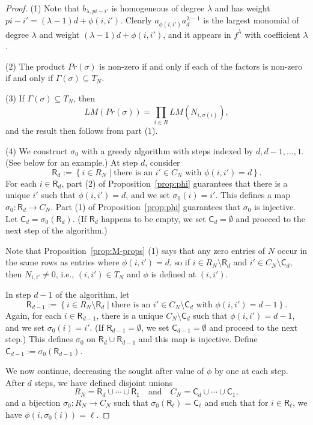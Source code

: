 \documentclass[12pt,reqno]{amsart}
\numberwithin{equation}{section}
\theoremstyle{plain}
\theoremstyle{definition}
\theoremstyle{remark}
\numberwithin{equation}{section}
\newcommand{\<}{\langle}
\renewcommand{\>}{\rangle}
\renewcommand{\and}{\quad\text{and}\quad}
\newcommand{\Rs}{\mathsf{R}}
\newcommand{\Cs}{\mathsf{C}}
\begin{document}
\begin{proof}\mbox{}
  (1) Note that $b_{\lambda,pi-i'}$ is homogeneous of degree $\lambda$
  and has weight $pi-i'=(\lambda-1)d+\phi(i,i')$.  Clearly
  $a_{\phi(i,i')}a_d^{\lambda-1}$ is the largest monomial of degree
  $\lambda$ and weight $(\lambda-1)d+\phi(i,i')$, and it appears in
  $f^\lambda$ with coefficient $\lambda$.

  (2) The product $Pr(\sigma)$ is non-zero if and only if each of the factors is
  non-zero if and only if $\Gamma(\sigma)\subseteq T_N$.

  (3) If $\Gamma(\sigma)\subseteq T_N$, then
  \[ LM(Pr(\sigma))=\prod_{i\in R} LM(N_{i,\sigma(i)}),\]
  and the result then follows from part (1).

  (4) We construct $\sigma_0$ with a greedy algorithm with steps
  indexed by $d,d-1,\dots,1$.  (See below for an example.)  At step
  $d$, consider
\[\Rs_d:=\left\{i\in R_N\mid\text{there is an $i'\in C_N$ with
      $\phi(i,i')=d$}\right\}.\]
For each $i\in \Rs_d$, part (2) of Proposition~\ref{prop:phi}
guarantees that there is a unique $i'$ such that $\phi(i,i')=d$, and
we set $\sigma_0(i)=i'$. This defines a map $\sigma_0:\Rs_d\to C_N$.
Part (1) of Proposition~\ref{prop:phi} guarantees that $\sigma_0$ is
injective.  Let $\Cs_d=\sigma_0(\Rs_d)$.  (If $\Rs_d$ happens to be
empty, we set $\Cs_d=\emptyset$ and proceed to the next step of the
algorithm.)

Note that Proposition~\ref{prop:M-props} (1) says that any zero
entries of $N$ occur in the same rows as entries where $\phi(i,i')=d$,
so if $i\in R_N\setminus \Rs_d$ and $i'\in C_N\setminus \Cs_d$, then
$N_{i,i'}\neq0$, i.e., $(i,i')\in T_N$ and $\phi$ is defined at
$(i,i')$.

In step $d-1$ of the algorithm, let
\[\Rs_{d-1}:=\left\{i\in R_N\setminus \Rs_d\mid\text{there is an $i'\in
      C_N\setminus \Cs_d$ with $\phi(i,i')=d-1$}\right\}.\]
Again, for each $i\in \Rs_{d-1}$, there is a unique
$C_N\setminus \Cs_d$ such that $\phi(i,i')=d-1$, and we set
$\sigma_0(i)=i'$.  (If $\Rs_{d-1}=\emptyset$, we set
$\Cs_{d-1}=\emptyset$ and proceed to the next step.)  This defines
$\sigma_0$ on $\Rs_d\cup \Rs_{d-1}$ and this map is injective.  Define
$\Cs_{d-1}:=\sigma_0(\Rs_{d-1})$.

We now continue, decreasing the sought after value of $\phi$ by one at
each step.  After $d$ steps, we have defined disjoint unions
\[R_N=\Rs_d\cup\cdots\cup\Rs_1
  \and
  C_N=\Cs_d\cup\cdots\cup\Cs_1,\]
  and a bijection $\sigma_0:R_N\to C_N$ such that
  $\sigma_0(\Rs_\ell)=\Cs_\ell$ and such that for $i\in \Rs_\ell$, we
  have $\phi(i,\sigma_0(i))=\ell$.


\end{proof}
\end{document}
